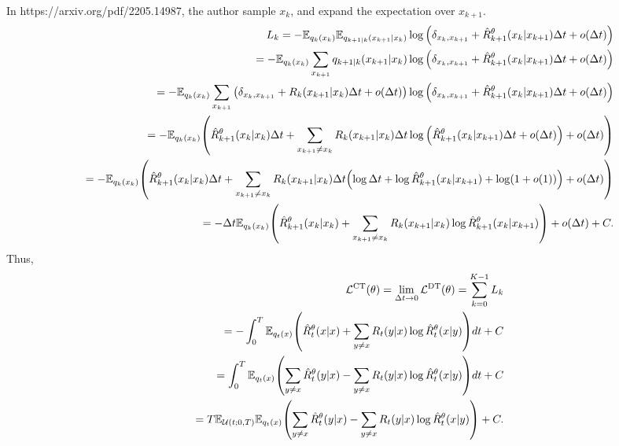 \documentclass[10pt]{article}
\begin{document}
In https://arxiv.org/pdf/2205.14987, the author sample $x_k$, and expand the expectation over $x_{k+1}$.
\begin{eqnarray*}
&&L_k = -\mathbb{E}_{q_k(x_k)}\mathbb{E}_{q_{k+1|k}\qty(x_{k+1}|x_k)}\log \qty(\delta_{x_k,x_{k+1}} + \hat{R}_{k+1}^\theta\qty(x_k|x_{k+1})\Delta t + o(\Delta t)) \\
&&= -\mathbb{E}_{q_k(x_k)}\sum_{x_{k+1}}q_{k+1|k}\qty(x_{k+1}|x_k)\log \qty(\delta_{x_k,x_{k+1}} + \hat{R}_{k+1}^\theta\qty(x_k|x_{k+1})\Delta t + o(\Delta t)) \\
&&= -\mathbb{E}_{q_k(x_k)}\sum_{x_{k+1}}\qty(\delta_{x_k,x_{k+1}} + R_k\qty(x_{k+1}|x_k)\Delta t + o(\Delta t))\log \qty(\delta_{x_k,x_{k+1}} + \hat{R}_{k+1}^\theta\qty(x_k|x_{k+1})\Delta t + o(\Delta t)) \\
&&= -\mathbb{E}_{q_k(x_k)}\qty(\hat{R}_{k+1}^\theta\qty(x_k|x_k)\Delta t + \sum_{x_{k+1}\neq x_k}R_k\qty(x_{k+1}|x_k)\Delta t \log \qty(\hat{R}_{k+1}^\theta\qty(x_k|x_{k+1})\Delta t + o(\Delta t)) + o(\Delta t)) \\
&&= -\mathbb{E}_{q_k(x_k)}\qty(\hat{R}_{k+1}^\theta\qty(x_k|x_k)\Delta t + \sum_{x_{k+1}\neq x_k}R_k\qty(x_{k+1}|x_k)\Delta t \qty(\log\Delta t + \log \hat{R}_{k+1}^\theta\qty(x_k|x_{k+1}) + \log(1 + o(1))) + o(\Delta t)) \\
&&= -\Delta t\mathbb{E}_{q_k(x_k)}\qty(\hat{R}_{k+1}^\theta\qty(x_k|x_k) + \sum_{x_{k+1}\neq x_k}R_k\qty(x_{k+1}|x_k) \log \hat{R}_{k+1}^\theta\qty(x_k|x_{k+1})) + o(\Delta t) + C.
\end{eqnarray*}
Thus,
\begin{eqnarray*}
  &&\mathcal{L}^\text{CT}(\theta) = \lim_{\Delta t\to 0}\mathcal{L}^\text{DT}(\theta) = \sum_{k=0}^{K-1}L_k \\
  &&= - \int_0^T \mathbb{E}_{q_t(x)}\qty(\hat{R}_t^\theta(x|x) + \sum_{y\neq x}R_t(y|x)\log\hat{R}_t^\theta(x|y))dt + C\\
  &&=\int_0^T \mathbb{E}_{q_t(x)}\qty(\sum_{y\neq x}\hat{R}_t^\theta(y|x) - \sum_{y\neq x}R_t(y|x)\log\hat{R}_t^\theta(x|y))dt + C\\
  &&=T\mathbb{E}_{\mathcal{U}(t;0,T)}\mathbb{E}_{q_t(x)}\qty(\sum_{y\neq x}\hat{R}_t^\theta(y|x) - \sum_{y\neq x}R_t(y|x)\log\hat{R}_t^\theta(x|y)) + C.
\end{eqnarray*}
\end{document}
